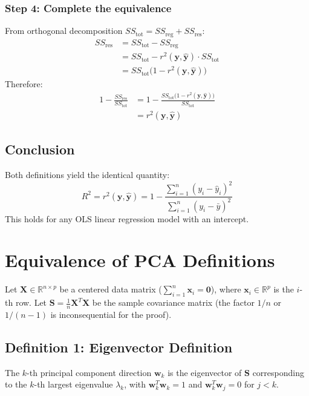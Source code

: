 \documentclass{article}
\begin{document}
\subsubsection*{Step 4: Complete the equivalence}
From orthogonal decomposition $SS_{\text{tot}} = SS_{\text{reg}} + SS_{\text{res}}$:
\begin{align}
    SS_{\text{res}} &= SS_{\text{tot}} - SS_{\text{reg}} \\
    &= SS_{\text{tot}} - r^2(\mathbf{y}, \hat{\mathbf{y}}) \cdot SS_{\text{tot}} \\
    &= SS_{\text{tot}}\big(1 - r^2(\mathbf{y}, \hat{\mathbf{y}})\big)
\end{align}
Therefore:
\begin{align}
    1 - \frac{SS_{\text{res}}}{SS_{\text{tot}}} &= 1 - \frac{SS_{\text{tot}}\big(1 - r^2(\mathbf{y}, \hat{\mathbf{y}})\big)}{SS_{\text{tot}}} \\
    &= r^2(\mathbf{y}, \hat{\mathbf{y}})
\end{align}

\subsection*{Conclusion}
Both definitions yield the identical quantity:
\begin{equation}
    \boxed{R^2 = r^2(\mathbf{y}, \hat{\mathbf{y}}) = 1 - \frac{\sum_{i=1}^n (y_i - \hat{y}_i)^2}{\sum_{i=1}^n (y_i - \bar{y})^2}}
\end{equation}
This holds for any OLS linear regression model with an intercept.











\section*{Equivalence of PCA Definitions}

Let $\mathbf{X} \in \mathbb{R}^{n \times p}$ be a centered data matrix ($\sum_{i=1}^n \mathbf{x}_i = \mathbf{0}$), where $\mathbf{x}_i \in \mathbb{R}^p$ is the $i$-th row. Let $\mathbf{S} = \frac{1}{n}\mathbf{X}^T\mathbf{X}$ be the sample covariance matrix (the factor $1/n$ or $1/(n-1)$ is inconsequential for the proof).

\subsection*{Definition 1: Eigenvector Definition}
The $k$-th principal component direction $\mathbf{w}_k$ is the eigenvector of $\mathbf{S}$ corresponding to the $k$-th largest eigenvalue $\lambda_k$, with $\mathbf{w}_k^T\mathbf{w}_k = 1$ and $\mathbf{w}_k^T\mathbf{w}_j = 0$ for $j < k$.
\end{document}
